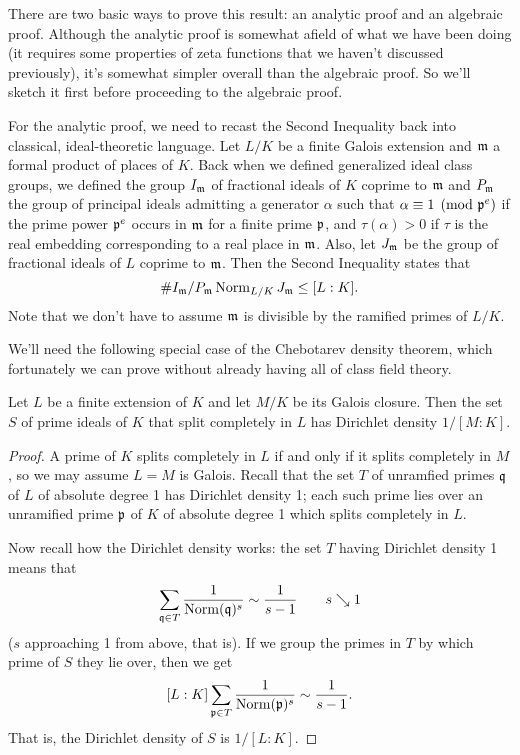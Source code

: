 There are two basic ways to prove this result: an analytic proof and
an algebraic proof. Although the analytic proof is somewhat afield of
what we have been doing (it requires some properties of zeta functions
that we haven't discussed previously), it's somewhat simpler overall than the
algebraic proof. So we'll sketch it first before proceeding to the algebraic
proof.


For the analytic proof, we need to recast the Second Inequality back into
classical, ideal-theoretic language. Let $L/K$ be a finite Galois extension
and $\mathfrak{m}$ a formal product of places of $K$. Back when we defined
generalized ideal class groups, we defined the group $I_{\mathfrak{m}}$ of
fractional ideals of $K$ coprime to $\mathfrak{m}$ and $P_{\mathfrak{m}}$ the group
of principal ideals admitting a generator $\alpha$ such that 
$\alpha \equiv 1 \pmod{\mathfrak{p}^e}$ if the prime power $\mathfrak{p}^e$ occurs
in $\mathfrak{m}$ for a finite prime $\mathfrak{p}$, and $\tau(\alpha) > 0$ if 
$\tau$ is the real embedding corresponding to a real place in $\mathfrak{m}$.
Also, let $J_{\mathfrak{m}}$ be the group of fractional ideals of $L$
coprime to $\mathfrak{m}$. Then the Second Inequality states that
\[
\# I_{\mathfrak{m}} / P_{\mathfrak{m}} \operatorname{Norm}_{L/K} J_{\mathfrak{m}} \leq [L:K].
\]
Note that we don't have to assume $\mathfrak{m}$ is divisible by the ramified
primes of $L/K$.

We'll need the following special case of the Chebotarev density theorem,
which fortunately we can prove without already having all of class field
theory.
\begin{prop}
Let $L$ be a finite extension of $K$ and let $M/K$ be its Galois closure.
Then the set $S$ of prime ideals of $K$ that split completely in $L$ has
Dirichlet density $1/[M:K]$.
\end{prop}
\begin{proof}
A prime of $K$ splits completely in $L$ if and only if it splits completely
in $M$, so we may assume $L=M$ is Galois. Recall that the set $T$ of unramfied
primes
$\mathfrak{q}$ of $L$ of absolute degree 1 has Dirichlet density 1;
each such prime lies over an unramified prime $\mathfrak{p}$ of $K$ of absolute
degree 1 
which splits completely in $L$.

Now recall how the Dirichlet density works: the set $T$ having
Dirichlet density 1 means that
\[
\sum_{\mathfrak{q} \in T} \frac{1}{\operatorname{Norm}(\mathfrak{q})^s} \sim \frac{1}{s-1}
\qquad s \searrow  1
\]
($s$ approaching 1 from above, that is). If we group the primes in $T$ by
which prime of $S$ they lie over, then we get
\[
[L:K] \sum_{\mathfrak{p} \in T} \frac{1}{\operatorname{Norm}(\mathfrak{p})^s} \sim \frac{1}{s-1}.
\]
That is, the Dirichlet density of $S$ is $1/[L:K]$.
\end{proof}

